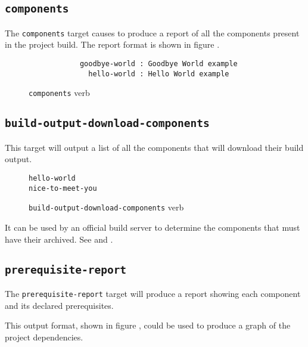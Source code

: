 \subsection{\texttt{components}}\label{usinglmsbw:target:components}

The \texttt{components} target causes \lmsbw to produce a report of all
the components present in the project build.  The report format is
shown in figure .

\begin{figure}[tbh]
\hrulefill
\begin{verbatim}
            goodbye-world : Goodbye World example
              hello-world : Hello World example
\end{verbatim}
\hrulefill
\caption{\texttt{components} verb}\label{usinglmsbw:components-verb}
\end{figure}

\subsection{\texttt{build-output-download-components}}
\label{build-output-download-components}

This target will output a list of all the components that will
download their build output.

\begin{figure}[tbh]
\hrulefill
\begin{verbatim}
hello-world
nice-to-meet-you
\end{verbatim}
\hrulefill
\caption{\texttt{build-output-download-components} verb}
\label{usinglmsbw:{build-output-download-components-verb}}
\end{figure}

It can be used by an official build server to determine the components
that must have their \destdir archived.  See
 and
.

\subsection{\texttt{prerequisite-report}}
\label{usinglmsbw:prerequisite-report}

  The \texttt{prerequisite-report} target will produce a report showing
  each component and its declared prerequisites.

This output format, shown in figure
, could be used to produce a
graph of the project dependencies.

